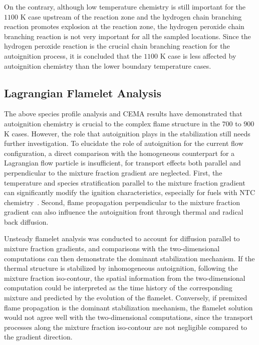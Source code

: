 \documentclass[review,3p,times]{elsarticle}
\begin{document}
On the contrary, although low temperature chemistry is still important for the $1100$ K case upstream of the reaction zone and the hydrogen chain branching reaction promotes explosion at the reaction zone, the hydrogen peroxide chain branching reaction is not very important for all the sampled locations.  Since the hydrogen peroxide reaction is the crucial chain branching reaction for the autoignition process, it is concluded that the $1100$ K case is less affected by autoignition chemistry than the lower boundary temperature cases.  

\subsection{Lagrangian Flamelet Analysis} \label{sec:LFA}
The above species profile analysis and CEMA results have demonstrated that autoignition chemistry is crucial to the complex flame structure in the $700$ to $900$ K cases.  However, the role that autoignition plays in the stabilization still needs further investigation.  To elucidate the role of autoignition for the current flow configuration, a direct comparison with the homogeneous counterpart for a Lagrangian flow particle is insufficient, for transport effects both parallel and perpendicular to the mixture fraction gradient are neglected.  First, the temperature and species stratification parallel to the mixture fraction gradient can significantly modify the ignition characteristics, especially for fuels with NTC chemistry~\cite{law12,deng14}.  Second, flame propagation perpendicular to the mixture fraction gradient can also influence the autoignition front through thermal and radical back diffusion. 

Unsteady flamelet analysis was conducted to account for diffusion parallel to mixture fraction gradients, and comparisons with the two-dimensional computations can then demonstrate the dominant stabilization mechanism.  If the thermal structure is stabilized by inhomogeneous autoignition, following the mixture fraction iso-contour, the spatial information from the two-dimensional computation could be interpreted as the time history of the corresponding mixture and predicted by the evolution of the flamelet.  Conversely, if premixed flame propagation is the dominant stabilization mechanism, the flamelet solution would not agree well with the two-dimensional computations, since the transport processes along the mixture fraction iso-contour are not negligible compared to the gradient direction. 
\end{document}
